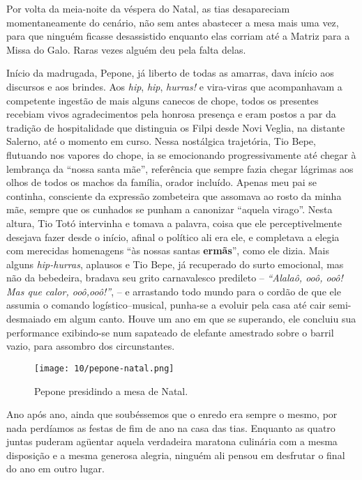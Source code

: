 Por volta da meia-noite da véspera do Natal, as tias desapareciam momentaneamente do cenário, não sem antes abastecer a mesa mais uma vez, para que ninguém ficasse desassistido enquanto elas corriam até a Matriz para a Missa do Galo.
Raras vezes alguém deu pela falta delas.


Início da madrugada, Pepone, já liberto de todas as amarras, dava início aos discursos e aos brindes.
Aos \textit{hip}, \textit{hip}, \textit{hurras!} e vira-viras que acompanhavam a competente ingestão de mais alguns canecos de chope, todos os presentes recebiam vivos agradecimentos pela honrosa presença e eram postos a par da tradição de hospitalidade que distinguia os Filpi desde Novi Veglia, na distante Salerno, até o momento em curso.
Nessa nostálgica trajetória, Tio Bepe, flutuando nos vapores do chope, ia se emocionando progressivamente até chegar à lembrança da ``nossa santa mãe'', referência que sempre fazia chegar lágrimas aos olhos de todos os machos da família, orador incluído.
Apenas meu pai se continha, consciente da expressão zombeteira que assomava ao rosto da minha mãe, sempre que os cunhados se punham a canonizar ``aquela virago''.
Nesta altura, Tio Totó intervinha e tomava a palavra, coisa que ele perceptivelmente desejava fazer desde o início, afinal o político ali era ele, e completava a elegia com merecidas homenagens ``às nossas santas {\large\bfseries ermãs}'', como ele dizia.
Mais alguns \textit{hip-hurras}, aplausos e Tio Bepe, já recuperado do surto emocional, mas não da bebedeira, bradava seu grito carnavalesco predileto -- \textit{``Alalaô, ooô, ooô! Mas que calor, ooô,ooô!''}, -- e arrastando todo mundo para o cordão de que ele assumia o comando logístico–musical, punha-se a evoluir pela casa até cair semi-desmaiado em algum canto.
Houve um ano em que se superando, ele concluiu sua performance exibindo-se num sapateado de elefante amestrado sobre o barril vazio, para assombro dos circunstantes.


\begin{figure}[H]
\centering
\texttt{[image: 10/pepone-natal.png]}
\caption{Pepone presidindo a mesa de Natal.}
\end{figure}

Ano após ano, ainda que soubéssemos que o enredo era sempre o mesmo, por nada perdíamos as festas de fim de ano na casa das tias.
Enquanto as quatro juntas puderam agüentar aquela verdadeira maratona culinária com a mesma disposição e a mesma generosa alegria, ninguém ali pensou em desfrutar o final do ano em outro lugar.

